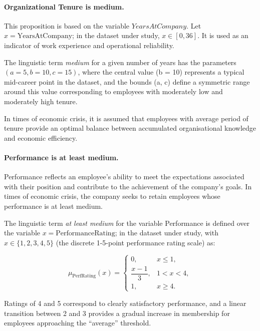 \documentclass[runningheads]{llncs}
\begin{document}
\paragraph{Organizational Tenure is medium.} This proposition is based on the variable $YearsAtCompany$. Let $x = \text{YearsAtCompany}$; in the dataset under study, $x \in [0,36]$. It is used as an indicator of work experience and operational reliability.

The linguistic term \textit{medium} for a given number of years has the parameters $(a=5, b = 10, c=15)$, where the central value (b = 10) represents a typical mid-career point in the dataset, and the bounds (a, c) define a symmetric range around this value corresponding to employees with moderately low and moderately high tenure.

In times of economic crisis, it is assumed that employees with average period of tenure provide an optimal balance between accumulated organisational knowledge and economic efficiency. 

\paragraph{Performance is at least medium.} Performance reflects an employee's ability to meet the expectations associated with their position and contribute to the achievement of the company's goals. In times of economic crisis, the company seeks to retain employees whose performance is at least medium.

The linguistic term \textit{at least medium} for the variable Performance is defined over the variable $x = \text{PerformanceRating}$; in the dataset under study, with $x \in \{1,2,3,4,5\}$ (the discrete 1-5-point performance rating scale) as: 

\[
\mu_{\text{PerfRating}}(x) =
\begin{cases}
0, & x \le 1, \\
\dfrac{x - 1}{3}, & 1 < x < 4, \\
1, & x \ge 4.
\end{cases}
\]

Ratings of 4 and 5 correspond to clearly satisfactory performance, and a linear transition between 2 and 3 provides a gradual increase in membership for employees approaching the “average” threshold.
\end{document}
